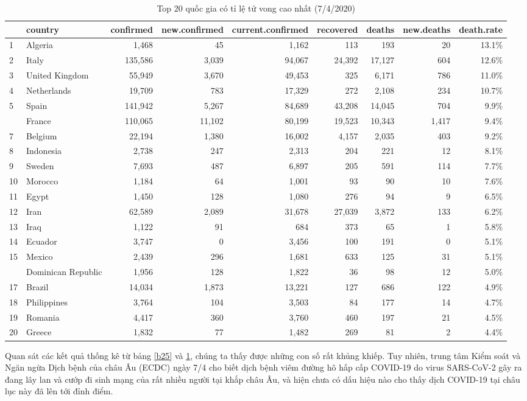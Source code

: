 \documentclass[12pt, a4paper,oneside]{book}
\theoremstyle{definition}
\begin{document}
\begin{table}[!h]
	\caption{Top 20 quốc gia có tỉ lệ tử vong cao nhất (7/4/2020)}
	\label{b26}
	\centering
	\fontsize{7}{9}\selectfont
	\begin{tabular}{llrrrrrrr}
		\toprule
		& country & confirmed & new.confirmed & current.confirmed & recovered & deaths & new.deaths & death.rate\\
		\midrule
		\rowcolor{gray!6}  1 & Algeria & 1,468 & 45 & 1,162 & 113 & 193 & 20 & 13.1\%\\
		2 & Italy & 135,586 & 3,039 & 94,067 & 24,392 & 17,127 & 604 & 12.6\%\\
		\rowcolor{gray!6}  3 & United Kingdom & 55,949 & 3,670 & 49,453 & 325 & 6,171 & 786 & 11.0\%\\
		4 & Netherlands & 19,709 & 783 & 17,329 & 272 & 2,108 & 234 & 10.7\%\\
		\rowcolor{gray!6}  5 & Spain & 141,942 & 5,267 & 84,689 & 43,208 & 14,045 & 704 & 9.9\%\\
		\addlinespace
		6 & France & 110,065 & 11,102 & 80,199 & 19,523 & 10,343 & 1,417 & 9.4\%\\
		\rowcolor{gray!6}  7 & Belgium & 22,194 & 1,380 & 16,002 & 4,157 & 2,035 & 403 & 9.2\%\\
		8 & Indonesia & 2,738 & 247 & 2,313 & 204 & 221 & 12 & 8.1\%\\
		\rowcolor{gray!6}  9 & Sweden & 7,693 & 487 & 6,897 & 205 & 591 & 114 & 7.7\%\\
		10 & Morocco & 1,184 & 64 & 1,001 & 93 & 90 & 10 & 7.6\%\\
		\addlinespace
		\rowcolor{gray!6}  11 & Egypt & 1,450 & 128 & 1,080 & 276 & 94 & 9 & 6.5\%\\
		12 & Iran & 62,589 & 2,089 & 31,678 & 27,039 & 3,872 & 133 & 6.2\%\\
		\rowcolor{gray!6}  13 & Iraq & 1,122 & 91 & 684 & 373 & 65 & 1 & 5.8\%\\
		14 & Ecuador & 3,747 & 0 & 3,456 & 100 & 191 & 0 & 5.1\%\\
		\rowcolor{gray!6}  15 & Mexico & 2,439 & 296 & 1,681 & 633 & 125 & 31 & 5.1\%\\
		\addlinespace
		16 & Dominican Republic & 1,956 & 128 & 1,822 & 36 & 98 & 12 & 5.0\%\\
		\rowcolor{gray!6}  17 & Brazil & 14,034 & 1,873 & 13,221 & 127 & 686 & 122 & 4.9\%\\
		18 & Philippines & 3,764 & 104 & 3,503 & 84 & 177 & 14 & 4.7\%\\
		\rowcolor{gray!6}  19 & Romania & 4,417 & 360 & 3,760 & 460 & 197 & 21 & 4.5\%\\
		20 & Greece & 1,832 & 77 & 1,482 & 269 & 81 & 2 & 4.4\%\\
		\bottomrule
	\end{tabular}
\end{table}
Quan sát các kết quả thống kê từ bảng \ref{b25} và \ref{b26}, chúng ta thấy được những con số rất khủng khiếp. Tuy nhiên, trung tâm Kiểm soát và Ngăn ngừa Dịch bệnh của châu Âu (ECDC) ngày 7/4 cho biết dịch bệnh viêm đường hô hấp cấp COVID-19 do virus SARS-CoV-2 gây ra đang lây lan và cướp đi sinh mạng của rất nhiều người tại khắp châu Âu, và hiện chưa có dấu hiệu nào cho thấy dịch COVID-19 tại châu lục này đã lên tới đỉnh điểm.
\end{document}
